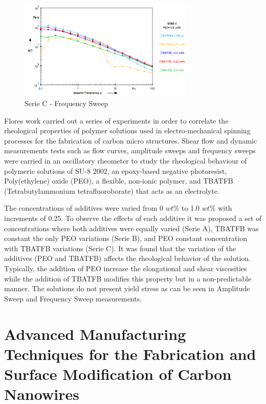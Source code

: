 \begin{figure}[th]
\centering
\includegraphics[width=0.75\textwidth]{./Figures/SerieCfreqSweep.png}
\decoRule
\caption[Serie C - Frequency Sweep]{Serie C - Frequency Sweep \cite{Flores2017}}
\label{fig:SerieCfreqSweep}
\end{figure}

Flores work \cite{Flores2017} carried out a series of experiments in order to correlate the rheological properties of polymer solutions used in electro-mechanical spinning processes for the fabrication of carbon micro structures. Shear flow and dynamic measurements tests such as flow curves, amplitude sweeps and frequency sweeps were carried in an oscillatory rheometer to study the rheological behaviour of polymeric solutions of SU-8 2002, an epoxy-based negative photoresist, Poly(ethylene) oxide (PEO), a flexible, non-ionic polymer, and TBATFB (Tetrabutylammonium tetrafluoroborate) that acts as an electrolyte.

The concentrations of additives were varied from 0 $w t \%$ to 1.0 $w t \%$ with increments of 0.25. To observe the effects of each additive it was proposed a set of concentrations where both additives were equally varied (Serie A), TBATFB was constant the only PEO variations (Serie B), and PEO constant concentration with TBATFB variations (Serie C). It was found that the variation of the additives (PEO and TBATFB) affects the
rheological behavior of the solution. Typically, the addition of PEO increase the
elongational and shear viscosities while the addition of TBATFB modifies this property
but in a non-predictable manner. The solutions do not present yield stress as can be
seen in Amplitude Sweep and Frequency Sweep measurements.

\clearpage

\section{Advanced Manufacturing Techniques for the Fabrication and Surface Modification of Carbon Nanowires \cite{Cardenas2017}}

